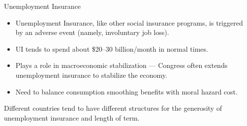 \documentclass[10pt]{extarticle}
\begin{document}
  \begin{problem}{Unemployment Insurance}
    \begin{itemize}
      \item Unemployment Insurance, like other social insurance programs, is triggered by an adverse event (namely, involuntary job loss).
      \item UI tends to spend about \$20--30 billion/month in normal times.
      \item Plays a role in macroeconomic stabilization --- Congress often extends unemployment insurance to stabilize the economy.
      \item Need to balance consumption smoothing benefits with moral hazard cost.
    \end{itemize}
    Different countries tend to have different structures for the generosity of unemployment insurance and length of term.
  \end{problem}
\end{document}
